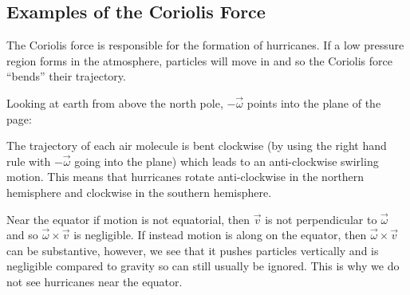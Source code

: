 \documentclass[../main.tex]{subfiles}
\begin{document}
\subsection{Examples of the Coriolis Force}
\begin{example}
  The Coriolis force is responsible for the formation of hurricanes.
  If a low pressure region forms in the atmosphere, particles will move in and so the Coriolis force ``bends'' their trajectory.

  Looking at earth from above the north pole, $-\vec{\omega}$ points into the plane of the page:
  \begin{center}
  \end{center}
  The trajectory of each air molecule is bent clockwise (by using the right hand rule with $-\vec{\omega}$ going into the plane) which leads to an anti-clockwise swirling motion.
  This means that hurricanes rotate anti-clockwise in the northern hemisphere and clockwise in the southern hemisphere.

  Near the equator if motion is not equatorial, then $\vec{v}$ is not perpendicular to $\vec{\omega}$ and so $\vec{\omega} \times \vec{v}$ is negligible.
  If instead motion is along on the equator, then $\vec{\omega} \times \vec{v}$ can be substantive, however, we see that it pushes particles vertically and is negligible compared to gravity so can still usually be ignored.
  This is why we do not see hurricanes near the equator.
\end{example}
\end{document}
